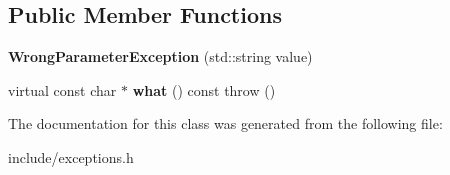 \subsection*{Public Member Functions}
\begin{DoxyCompactItemize}
\item 
\hypertarget{class_wrong_parameter_exception_a228fb340058bbb9b53adeabc56616099}{{\bfseries Wrong\+Parameter\+Exception} (std\+::string value)}\label{class_wrong_parameter_exception_a228fb340058bbb9b53adeabc56616099}

\item 
\hypertarget{class_wrong_parameter_exception_a7f79b5c6b6a8ac90bb51e00948d4dc29}{virtual const char $\ast$ {\bfseries what} () const   throw ()}\label{class_wrong_parameter_exception_a7f79b5c6b6a8ac90bb51e00948d4dc29}

\end{DoxyCompactItemize}


The documentation for this class was generated from the following file\+:\begin{DoxyCompactItemize}
\item 
include/exceptions.\+h\end{DoxyCompactItemize}
